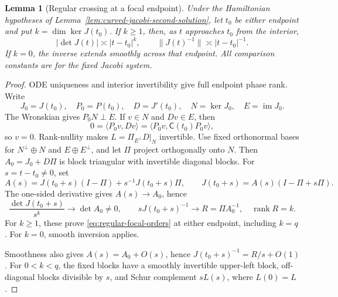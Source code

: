 \documentclass[11pt,reqno]{amsart}
\newtheorem{lemma}[theorem]{Lemma}
\theoremstyle{definition}
\theoremstyle{remark}
\numberwithin{equation}{section}
\begin{document}
\begin{lemma}[Regular crossing at a focal endpoint]
\label{lem:regular-focal-crossing}
Under the Hamiltonian hypotheses of
Lemma~\ref{lem:curved-jacobi-second-solution}, let \(t_0\) be either
endpoint and put \(k=\dim\ker J(t_0)\). If \(k\ge1\), then, as \(t\)
approaches \(t_0\) from the interior,
\begin{equation}
\label{eq:regular-focal-orders}
 |
 \det J(t)|\asymp|t-t_0|^k,\qquad
 \|J(t)^{-1}\|\asymp|t-t_0|^{-1}.
\end{equation}
If \(k=0\), the inverse extends smoothly across that endpoint.
All comparison constants are for the fixed Jacobi system.
\end{lemma}
\begin{proof}
ODE uniqueness and interior invertibility give full endpoint phase rank.
Write
\[
 J_0=J(t_0),\quad P_0=P(t_0),\quad D=J'(t_0),\quad
 N=\ker J_0,\quad E=\operatorname{im}J_0.
\]
The Wronskian gives \(P_0N\perp E\). If \(v\in N\) and
\(Dv\in E\), then
\[
 0=\langle P_0v,Dv\rangle
   =\langle P_0v,\mathsf C(t_0)P_0v\rangle,
\]
so \(v=0\). Rank-nullity makes \(L=\Pi_{E^\perp}D|_N\) invertible.
Use fixed orthonormal bases for \(N^\perp\oplus N\) and
\(E\oplus E^\perp\), and let \(\Pi\) project orthogonally onto \(N\). Then \(A_0=J_0+D\Pi\) is block
triangular with invertible diagonal blocks. For \(s=t-t_0\ne0\), set
\[
 A(s)=J(t_0+s)(I-\Pi)+s^{-1}J(t_0+s)\Pi,\qquad
 J(t_0+s)=A(s)(I-\Pi+s\Pi).
\]
The one-sided derivative gives \(A(s)\to A_0\), hence
\[
 \frac{\det J(t_0+s)}{s^k}\to\det A_0\ne0,\qquad
 sJ(t_0+s)^{-1}\to R=\Pi A_0^{-1},\quad \operatorname{rank}R=k.
\]
For \(k\ge1\), these prove \eqref{eq:regular-focal-orders} at either
endpoint, including \(k=q\). For \(k=0\), smooth inversion applies.

Smoothness also gives \(A(s)=A_0+O(s)\), hence
\(J(t_0+s)^{-1}=R/s+O(1)\). For \(0<k<q\), the fixed blocks have a
smoothly invertible upper-left block, off-diagonal blocks divisible by
\(s\), and Schur complement \(sL(s)\), where \(L(0)=L\).
\end{proof}
\end{document}
